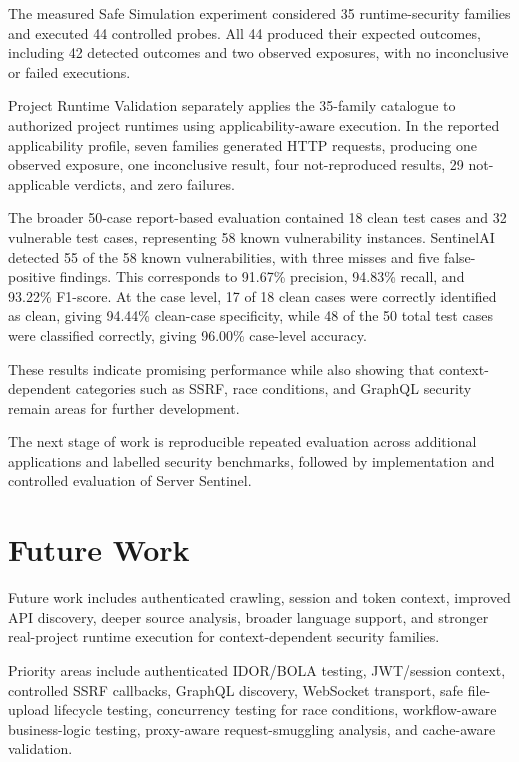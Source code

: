 \documentclass[journal]{IEEEtran}
\begin{document}
The measured Safe Simulation experiment considered 35 runtime-security
families and executed 44 controlled probes. All 44 produced their expected
outcomes, including 42 detected outcomes and two observed exposures, with no
inconclusive or failed executions.

Project Runtime Validation separately applies the 35-family catalogue to
authorized project runtimes using applicability-aware execution. In the
reported applicability profile, seven families generated HTTP requests,
producing one observed exposure, one inconclusive result, four
not-reproduced results, 29 not-applicable verdicts, and zero failures.

The broader 50-case report-based evaluation contained 18 clean test cases
and 32 vulnerable test cases, representing 58 known vulnerability instances.
SentinelAI detected 55 of the 58 known vulnerabilities, with three misses
and five false-positive findings. This corresponds to 91.67\% precision,
94.83\% recall, and 93.22\% F1-score. At the case level, 17 of 18 clean
cases were correctly identified as clean, giving 94.44\% clean-case
specificity, while 48 of the 50 total test cases were classified correctly,
giving 96.00\% case-level accuracy.

These results indicate promising performance while also showing that
context-dependent categories such as SSRF, race conditions, and GraphQL
security remain areas for further development.

The next stage of work is reproducible repeated evaluation across additional
applications and labelled security benchmarks, followed by implementation
and controlled evaluation of Server Sentinel.

\section{Future Work}

Future work includes authenticated crawling, session and token context,
improved API discovery, deeper source analysis, broader language support,
and stronger real-project runtime execution for context-dependent security
families.

Priority areas include authenticated IDOR/BOLA testing, JWT/session context,
controlled SSRF callbacks, GraphQL discovery, WebSocket transport, safe
file-upload lifecycle testing, concurrency testing for race conditions,
workflow-aware business-logic testing, proxy-aware request-smuggling
analysis, and cache-aware validation.
\end{document}
